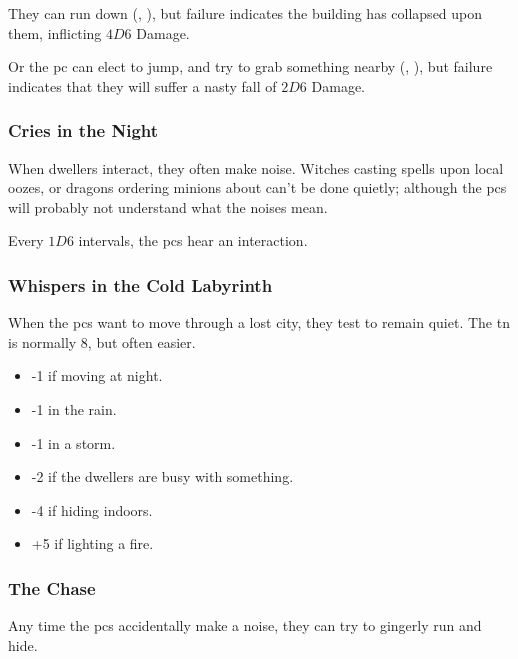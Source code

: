 \begin{multicols}{2}
\begin{dlist}
  They can run down (, \tn[9]), but failure indicates the building has collapsed upon them, inflicting $4D6$ Damage.

  Or the \gls{pc} can elect to jump, and try to grab something nearby (, \tn[12]), but failure indicates that they will suffer a nasty fall of $2D6$ Damage.
\end{dlist}

\bigLine

\subsubsection{Cries in the Night}
\label{lostCries}

When dwellers interact, they often make noise.
Witches casting spells upon local oozes, or dragons ordering minions about can't be done quietly; although the \glspl{pc} will probably not understand what the noises mean.

Every $1D6$ \glspl{interval}, the \glspl{pc} hear an interaction.

\subsubsection{Whispers in the Cold Labyrinth}
\label{lostWhispers}

When the \glspl{pc} want to move through a lost city, they test  to remain quiet.
The \gls{tn} is normally 8, but often easier.

\begin{itemize}
  \item
  -1 if moving at night.
  \item
  -1 in the rain.
  \item
  -1 in a storm.
  \item
  -2 if the dwellers are busy with something.
  \item
  -4 if hiding indoors.
  \item
  +5 if lighting a fire.
\end{itemize}

\subsubsection{The Chase}
\label{lostChase}

Any time the \glspl{pc} accidentally make a noise, they can try to gingerly run and hide.


\end{multicols}

